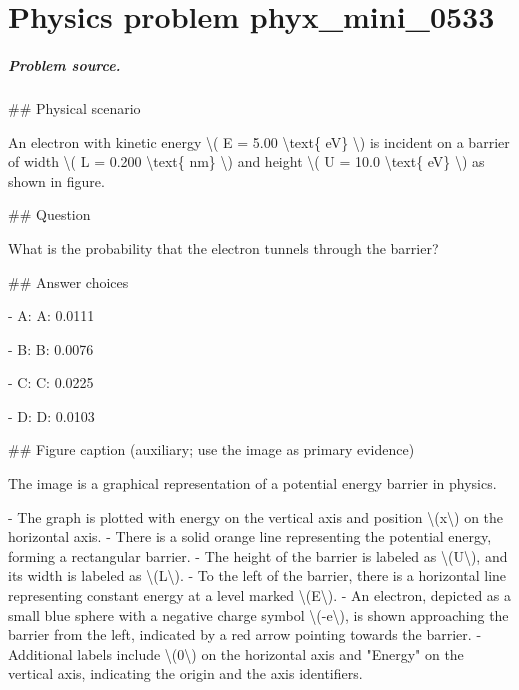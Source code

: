 
\chapter{Physics problem phyx\_mini\_0533}
\label{ch:PhyXMiniProblems_problem_phyx_mini_0533}

\paragraph{Problem source.}
\#\# Physical scenario

An electron with kinetic energy \textbackslash{}( E = 5.00 \textbackslash{}text\{ eV\} \textbackslash{}) is incident on a barrier of width \textbackslash{}( L = 0.200 \textbackslash{}text\{ nm\} \textbackslash{}) and height \textbackslash{}( U = 10.0 \textbackslash{}text\{ eV\} \textbackslash{}) as shown in figure.

\#\# Question

What is the probability that the electron tunnels through the barrier?

\#\# Answer choices

- A: A: 0.0111

- B: B: 0.0076

- C: C: 0.0225

- D: D: 0.0103

\#\# Figure caption (auxiliary; use the image as primary evidence)

The image is a graphical representation of a potential energy barrier in physics. 

- The graph is plotted with energy on the vertical axis and position \textbackslash{}(x\textbackslash{}) on the horizontal axis.
- There is a solid orange line representing the potential energy, forming a rectangular barrier.
- The height of the barrier is labeled as \textbackslash{}(U\textbackslash{}), and its width is labeled as \textbackslash{}(L\textbackslash{}).
- To the left of the barrier, there is a horizontal line representing constant energy at a level marked \textbackslash{}(E\textbackslash{}).
- An electron, depicted as a small blue sphere with a negative charge symbol \textbackslash{}(-e\textbackslash{}), is shown approaching the barrier from the left, indicated by a red arrow pointing towards the barrier.
- Additional labels include \textbackslash{}(0\textbackslash{}) on the horizontal axis and "Energy" on the vertical axis, indicating the origin and the axis identifiers.

